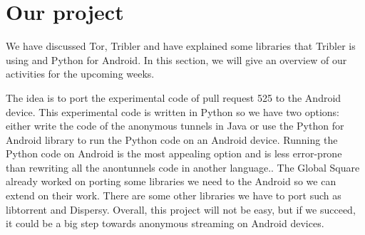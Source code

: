 \section{Our project}
	We have discussed Tor, Tribler and have explained some libraries that Tribler is using and Python for Android. In this section, we will give an overview of our activities for the upcoming weeks.
		
	The idea is to port the experimental code of pull request 525 to the Android device. This experimental code is written in Python so we have two options: either write the code of the anonymous tunnels in Java or use the Python for Android library to run the Python code on an Android device. Running the Python code on Android is the most appealing option and is less error-prone than rewriting all the anontunnels code in another language.. The Global Square already worked on porting some libraries we need to the Android so we can extend on their work. There are some other libraries we have to port such as libtorrent and Dispersy. Overall, this project will not be easy, but if we succeed, it could be a big step towards anonymous streaming on Android devices.